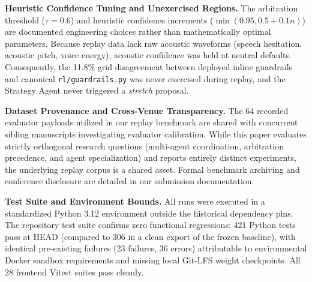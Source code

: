 \noindent\textbf{Heuristic Confidence Tuning and Unexercised Regions.} The arbitration threshold ($\tau = 0.6$) and heuristic confidence increments ($\min(0.95, 0.5 + 0.1n)$) are documented engineering choices rather than mathematically optimal parameters. Because replay data lack raw acoustic waveforms (speech hesitation, acoustic pitch, voice energy), acoustic confidence was held at neutral defaults. Consequently, the 11.8\% grid disagreement between deployed inline guardrails and canonical \texttt{rl/guardrails.py} was never exercised during replay, and the Strategy Agent never triggered a \emph{stretch} proposal.

\noindent\textbf{Dataset Provenance and Cross-Venue Transparency.} The 64 recorded evaluator payloads utilized in our replay benchmark are shared with concurrent sibling manuscripts investigating evaluator calibration. While this paper evaluates strictly orthogonal research questions (multi-agent coordination, arbitration precedence, and agent specialization) and reports entirely distinct experiments, the underlying replay corpus is a shared asset. Formal benchmark archiving and conference disclosure are detailed in our submission documentation.

\noindent\textbf{Test Suite and Environment Bounds.} All runs were executed in a standardized Python 3.12 environment outside the historical dependency pins. The repository test suite confirms zero functional regressions: 421 Python tests pass at HEAD (compared to 306 in a clean export of the frozen baseline), with identical pre-existing failures (23 failures, 36 errors) attributable to environmental Docker sandbox requirements and missing local Git-LFS weight checkpoints. All 28 frontend Vitest suites pass cleanly.
